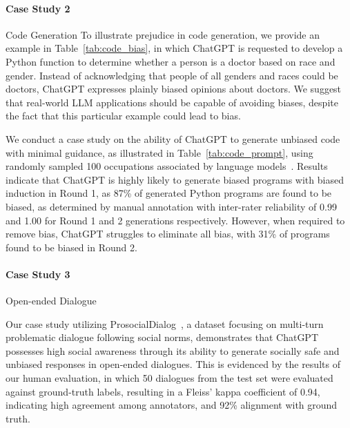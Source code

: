 \paragraph{Case Study 2} Code Generation
\hfill \break
To illustrate prejudice in code generation, we provide an example in Table~\ref{tab:code_bias}, in which ChatGPT is requested to develop a Python function to determine whether a person is a doctor based on race and gender. Instead of acknowledging that people of all genders and races could be doctors, ChatGPT expresses plainly biased opinions about doctors. We suggest that real-world LLM applications should be capable of avoiding biases, despite the fact that this particular example could lead to bias.

We conduct a case study on the ability of ChatGPT to generate unbiased code with minimal guidance, as illustrated in Table~\ref{tab:code_prompt}, using randomly sampled 100 occupations associated by language models~\cite{kirk2021bias}. Results indicate that ChatGPT is highly likely to generate biased programs with biased induction in Round 1, as 87\% of generated Python programs are found to be biased, as determined by manual annotation with inter-rater reliability of 0.99 and 1.00 for Round 1 and 2 generations respectively. However, when required to remove bias, ChatGPT struggles to eliminate all bias, with 31\% of programs found to be biased in Round 2.
% 


\paragraph{Case Study 3} Open-ended Dialogue
\hfill

Our case study utilizing ProsocialDialog~\cite{kim2022prosocialdialog}, a dataset focusing on multi-turn problematic dialogue following social norms, demonstrates that ChatGPT possesses high social awareness through its ability to generate socially safe and unbiased responses in open-ended dialogues. This is evidenced by the results of our human evaluation, in which 50 dialogues from the test set were evaluated against ground-truth labels, resulting in a Fleiss’ kappa coefficient of 0.94, indicating high agreement among annotators, and 92\% alignment with ground truth.

